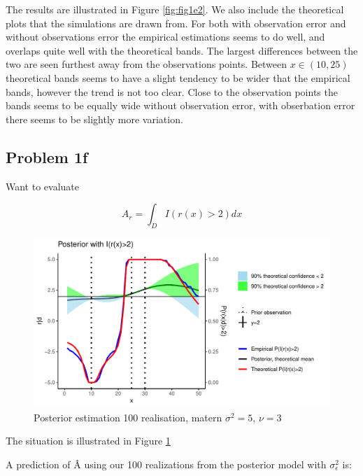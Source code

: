 \documentclass[]{article}
\begin{document}
The results are illustrated in Figure \ref{fig:fig1e2}. We also include
the theoretical plots that the simulations are drawn from. For both with
observation error and without observations error the empirical
estimations seems to do well, and overlaps quite well with the
theoretical bands. The largest differences between the two are seen
furthest away from the observations points. Between \(x\in(10,25)\)
theoretical bands seems to have a slight tendency to be wider that the
empirical bands, however the trend is not too clear. Close to the
observation points the bands seems to be equally wide without
observation error, with obserbation error there seems to be slightly
more variation.

\subsection{Problem 1f}\label{problem-1f}

Want to evaluate

\begin{equation}
    A_r = \int_D I(r(x) > 2)dx
\end{equation}

\begin{figure}

{\centering \includegraphics{Exercise_1_files/figure-latex/fig1f1-1} 

}

\caption{\label{fig:fig1f1} Posterior estimation 100 realisation, matern $\sigma^2 = 5$, $\nu = 3$}\label{fig:fig1f1}
\end{figure}

The situation is illustrated in Figure \ref{fig:fig1f1}

A prediction of Â using our 100 realizations from the posterior model
with \(\sigma_\epsilon^2\) is:
\end{document}
